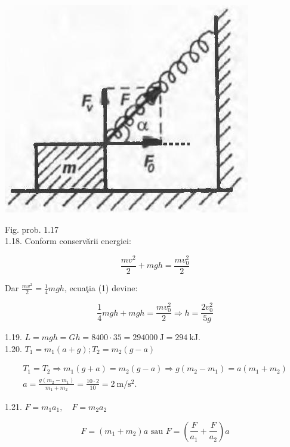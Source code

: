 \documentclass[10pt]{article}
\begin{document}
\begin{center}
\includegraphics[max width=\textwidth]{2025_07_01_5b3ff9fa0d508c8e9f17g-201}
\end{center}

Fig. prob. 1.17\\
1.18. Conform conservării energiei:


\begin{equation*}
\frac{m v^{2}}{2}+m g h=\frac{m v_{0}^{2}}{2} \tag{1}
\end{equation*}


Dar $\frac{m v^{2}}{2}=\frac{1}{4} m g h$, ecuaţia (1) devine:

$$
\frac{1}{4} m g h+m g h=\frac{m v_{0}^{2}}{2} \Rightarrow h=\frac{2 v_{0}^{2}}{5 g}
$$

1.19. $L=m g h=G h=8400 \cdot 35=294000 \mathrm{~J}=294 \mathrm{~kJ}$.\\
1.20. $T_{1}=m_{1}(a+g) ; T_{2}=m_{2}(g-a)$

$$
\begin{gathered}
T_{1}=T_{2} \Rightarrow m_{1}(g+a)=m_{2}(g-a) \Rightarrow g\left(m_{2}-m_{1}\right)=a\left(m_{1}+m_{2}\right) \\
a=\frac{g\left(m_{2}-m_{1}\right)}{m_{1}+m_{2}}=\frac{10 \cdot 2}{10}=2 \mathrm{~m} / \mathrm{s}^{2} .
\end{gathered}
$$

1.21. $F=m_{1} a_{1}, \quad F=m_{2} a_{2}$

$$
F=\left(m_{1}+m_{2}\right) a \text { sau } F=\left(\frac{F}{a_{1}}+\frac{F}{a_{2}}\right) a
$$
\end{document}
